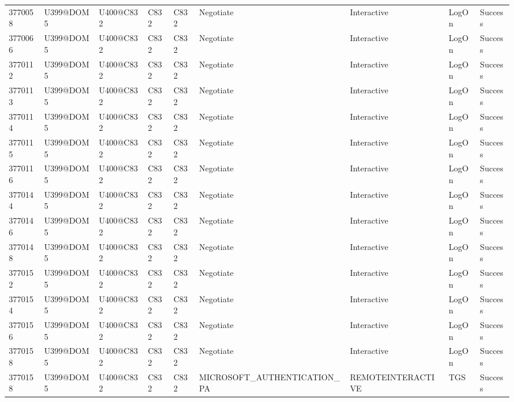 \begin{table}[htbp]
{\begin{tabular}{lllllllll}
			3770058 & U399@DOM5 & U400@C832 & C832 & C832 & Negotiate & Interactive & LogOn & Success \\
			3770066 & U399@DOM5 & U400@C832 & C832 & C832 & Negotiate & Interactive & LogOn & Success \\
			3770112 & U399@DOM5 & U400@C832 & C832 & C832 & Negotiate & Interactive & LogOn & Success \\
			3770113 & U399@DOM5 & U400@C832 & C832 & C832 & Negotiate & Interactive & LogOn & Success \\
			3770114 & U399@DOM5 & U400@C832 & C832 & C832 & Negotiate & Interactive & LogOn & Success \\
			3770115 & U399@DOM5 & U400@C832 & C832 & C832 & Negotiate & Interactive & LogOn & Success \\
			3770116 & U399@DOM5 & U400@C832 & C832 & C832 & Negotiate & Interactive & LogOn & Success \\
			3770144 & U399@DOM5 & U400@C832 & C832 & C832 & Negotiate & Interactive & LogOn & Success \\
			3770146 & U399@DOM5 & U400@C832 & C832 & C832 & Negotiate & Interactive & LogOn & Success \\
			3770148 & U399@DOM5 & U400@C832 & C832 & C832 & Negotiate & Interactive & LogOn & Success \\
			3770152 & U399@DOM5 & U400@C832 & C832 & C832 & Negotiate & Interactive & LogOn & Success \\
			3770154 & U399@DOM5 & U400@C832 & C832 & C832 & Negotiate & Interactive & LogOn & Success \\
			3770156 & U399@DOM5 & U400@C832 & C832 & C832 & Negotiate & Interactive & LogOn & Success \\
			3770158 & U399@DOM5 & U400@C832 & C832 & C832 & Negotiate & Interactive & LogOn & Success \\
			3770158 & U399@DOM5 & U400@C832 & C832 & C832 & MICROSOFT\_AUTHENTICATION\_PA & REMOTEINTERACTIVE & TGS & Success
		\end{tabular}
	}
\end{table}

